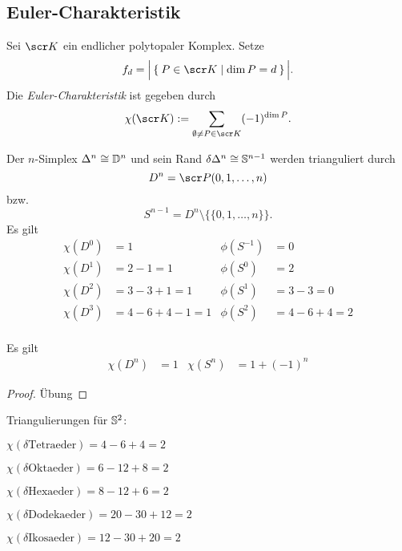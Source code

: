 \subsection{Euler-Charakteristik}

\begin{df}
	Sei $\scr K$ ein endlicher polytopaler Komplex.
	Setze
	\[
		f_d = \Big| \Set{ P \in \scr K | \dim P = d } \Big|.
	\]
	Die \emph{Euler-Charakteristik} ist gegeben durch
	\[
		\chi(\scr K)
		:= \sum_{\emptyset \neq P \in \scr K}
		(-1)^{\dim P}.
	\]
\end{df}

\begin{ex}
	Der $n$-Simplex $\Delta^n \homeomorphic \D^n$ und sein Rand $\boundary \Delta^n \homeomorphic \S^{n-1}$ werden trianguliert durch
	\[
		D^n
		= \scr P({0,1, \dotsc, n})
	\]
	bzw.
	\[
		S^{n-1}
		= D^n \setminus \{ \{0,1,\dotsc,n\} \}.
	\]
	Es gilt
	\begin{align*}
		\chi(D^0) &= 1 &
		\phi(S^{-1}) &= 0 \\
		\chi(D^1) &= 2-1 = 1 &
		\phi(S^{0}) &= 2 \\
		\chi(D^2) &= 3 - 3 + 1 = 1 &
		\phi(S^{1}) &= 3 - 3 = 0 \\
		\chi(D^3) &= 4 - 6 + 4 - 1 = 1 &
		\phi(S^{2}) &= 4 - 6 + 4 = 2 \\
	\end{align*}
\end{ex}

\begin{prop}
	Es gilt
	\begin{align*}
		\chi(D^n) &= 1 &
		\chi(S^n) &= 1 + (-1)^n
	\end{align*}
	\begin{proof}
		Übung
	\end{proof}
\end{prop}

\begin{ex}
	Triangulierungen für $\S^2$:
	\begin{description}
		\item
			$\chi(\delta \text{Tetraeder}) = 4 - 6 + 4 = 2$
		\item
			$\chi(\delta \text{Oktaeder}) = 6 - 12 + 8 = 2$
		\item
			$\chi(\delta \text{Hexaeder}) = 8 - 12 + 6 = 2$
		\item
			$\chi(\delta \text{Dodekaeder}) = 20 - 30 + 12= 2$
		\item
			$\chi(\delta \text{Ikosaeder}) = 12 - 30 + 20= 2$
	\end{description}
\end{ex}

